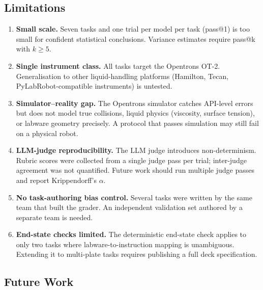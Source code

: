 \documentclass[11pt,a4paper]{article}
\begin{document}
\subsection{Limitations}

\begin{enumerate}[leftmargin=*]
  \item \textbf{Small scale.} Seven tasks and one trial per model per task
    (pass@1) is too small for confident statistical conclusions.
    Variance estimates require pass@k with $k \geq 5$.

  \item \textbf{Single instrument class.} All tasks target the Opentrons
    OT-2.
    Generalisation to other liquid-handling platforms (Hamilton, Tecan,
    PyLabRobot-compatible instruments) is untested.

  \item \textbf{Simulator--reality gap.} The Opentrons simulator catches
    API-level errors but does not model true collisions, liquid physics
    (viscosity, surface tension), or labware geometry precisely.
    A protocol that passes simulation may still fail on a physical robot.

  \item \textbf{LLM-judge reproducibility.} The LLM judge introduces
    non-determinism.
    Rubric scores were collected from a single judge pass per trial;
    inter-judge agreement was not quantified.
    Future work should run multiple judge passes and report Krippendorff's
    $\alpha$.

  \item \textbf{No task-authoring bias control.} Several tasks were written
    by the same team that built the grader.
    An independent validation set authored by a separate team is needed.

  \item \textbf{End-state checks limited.} The deterministic end-state
    check applies to only two tasks where labware-to-instruction mapping is
    unambiguous.
    Extending it to multi-plate tasks requires publishing a full deck
    specification.
\end{enumerate}

\subsection{Future Work}
\end{document}

